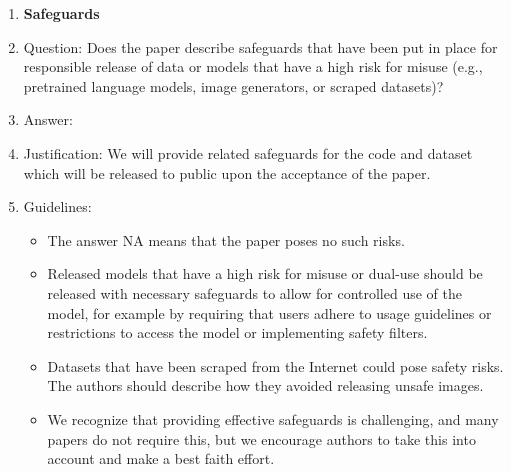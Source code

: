 \documentclass{article}
\begin{document}
\begin{enumerate}
\item {\bf Safeguards}
    \item[] Question: Does the paper describe safeguards that have been put in place for responsible release of data or models that have a high risk for misuse (e.g., pretrained language models, image generators, or scraped datasets)?
    \item[] Answer: \answerNo{} %
    \item[] Justification: We will provide related safeguards for the code and dataset which will be released to public upon the acceptance of the paper.
    \item[] Guidelines:
    \begin{itemize}
        \item The answer NA means that the paper poses no such risks.
        \item Released models that have a high risk for misuse or dual-use should be released with necessary safeguards to allow for controlled use of the model, for example by requiring that users adhere to usage guidelines or restrictions to access the model or implementing safety filters. 
        \item Datasets that have been scraped from the Internet could pose safety risks. The authors should describe how they avoided releasing unsafe images.
        \item We recognize that providing effective safeguards is challenging, and many papers do not require this, but we encourage authors to take this into account and make a best faith effort.
    \end{itemize}


\end{enumerate}
\end{document}
